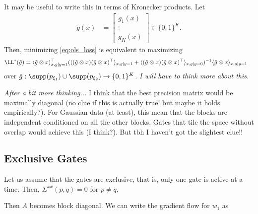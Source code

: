 \documentclass{article}
\begin{document}
It may be useful to write this in terms of Kronecker products.
Let
\begin{align}
  \tilde{g}(x) &= \begin{bmatrix} g_1(x) \\ \vdots \\ g_K(x) \end{bmatrix} \in \{ 0,1 \}^K.
\end{align}
Then, minimizing \cref{eq:ols_loss} is equivalent to maximizing
\begin{align}
  \LL^*(\tilde{g}) &= \langle \tilde{g} \otimes x \rangle_{x, g \mid y=1}^\top (\langle ( \tilde{g} \otimes x ) ( \tilde{g} \otimes x )^\top \rangle_{x, g \mid y=1} + \langle ( \tilde{g} \otimes x ) ( \tilde{g} \otimes x )^\top \rangle_{x, g \mid y=0})^{-1} \langle \tilde{g} \otimes x \rangle_{x, g \mid y=1} \label{eq:ols_kron}
\end{align}
over $\tilde{g} : \supp(p_{\xi_1}) \cup \supp(p_{\xi_2}) \to \{0,1\}^K$.
\emph{I will have to think more about this.}

\emph{After a bit more thinking...}
I think that the best precision matrix would be maximally diagonal (no clue if this is actually true! but maybe it holds empirically?).
For Gaussian data (at least), this mean that the blocks are independent conditioned on all the other blocks.
Gates that tile the space without overlap would achieve this (I think?).
But tbh I haven't got the slightest clue!!




\subsection{Exclusive Gates}
Let us assume that the gates are exclusive, that is, only one gate is active at a time.
Then, $\Sigma^{xx}(p,q) = 0$ for $p \neq q$.

Then $A$ becomes block diagonal.
We can write the gradient flow for $w_1$ as
\end{document}
